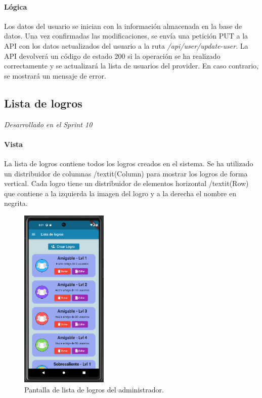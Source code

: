 \paragraph*{Lógica}
Los datos del usuario se inician con la información almacenada en la base de datos. Una vez confirmadas las modificaciones, 
se envía una petición PUT a la API con los datos actualizados del usuario a la ruta \textit{/api/user/update-user}. 
La API devolverá un código de estado 200 si la operación se ha realizado correctamente y se actualizará la lista de usuarios del provider. 
En caso contrario, se mostrará un mensaje de error.


\subsection{Lista de logros} 

\textit{Desarrollado en el Sprint 10}
\paragraph*{Vista}
La lista de logros contiene todos los logros creados en el sistema. Se ha utilizado un distribuidor de columnas /textit{(Column)} para mostrar los logros de forma vertical. 
Cada logro tiene un distribuidor de elementos horizontal /textit{(Row)} que contiene a la izquierda la imagen del logro y a la derecha el nombre en negrita. 

\begin{figure}[H]
  \centering
  \includegraphics[width=0.37\textwidth]{imagenes/c7/listalogros.png}
  \caption{Pantalla de lista de logros del administrador.} 
  \label{fig:listalogros}
\end{figure}



